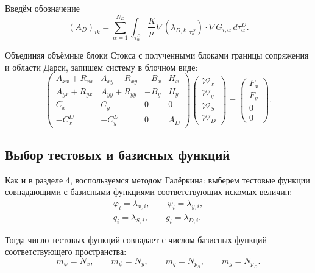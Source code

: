 \documentclass[a4paper,14pt]{extarticle}
\begin{document}
Введём обозначение
\begin{equation}
	(A_D)_{ik}
	=
	\sum_{\alpha=1}^{N_D}
	\int_{\tau^D_\alpha}
	\frac{K}{\mu}
	\nabla\left(
		\lambda_{D,k}|_{\tau^D_\alpha}
	\right)
	\cdot\nabla G_{i,\alpha}
	\,d\tau^D_\alpha.
\end{equation}

Объединяя объёмные блоки Стокса с полученными блоками
границы сопряжения и области Дарси, запишем систему
в блочном виде:
\begin{equation}
	\begin{pmatrix}
		A_{xx}+R_{xx} & A_{xy}+R_{xy} & -B_x & H_x\\
		A_{yx}+R_{yx} & A_{yy}+R_{yy} & -B_y & H_y\\
		C_x & C_y & 0 & 0\\
		-C_x^D & -C_y^D & 0 & A_D
	\end{pmatrix}
	\begin{pmatrix}
		\mathcal W_x\\
		\mathcal W_y\\
		\mathcal W_S\\
		\mathcal W_D
	\end{pmatrix}
	=
	\begin{pmatrix}
		F_x\\
		F_y\\
		0\\
		0
	\end{pmatrix}.
	\label{eq:stokes_darcy_block_system}
\end{equation}



\subsection{Выбор тестовых и базисных функций}

Как и в разделе 4, воспользуемся методом Галёркина:
выберем тестовые функции совпадающими с базисными
функциями соответствующих искомых величин:
\begin{equation}
	\begin{gathered}
		\varphi_i=\lambda_{x,i},
		\qquad
		\psi_i=\lambda_{y,i},
		\\[6pt]
		q_i=\lambda_{S,i},
		\qquad
		g_i=\lambda_{D,i}.
	\end{gathered}
\end{equation}

Тогда число тестовых функций совпадает с числом базисных
функций соответствующего пространства:
\begin{equation}
	m_\varphi=N_x,\qquad
	m_\psi=N_y,\qquad
	m_q=N_{p_S},\qquad
	m_g=N_{p_D}.
\end{equation}
\end{document}
